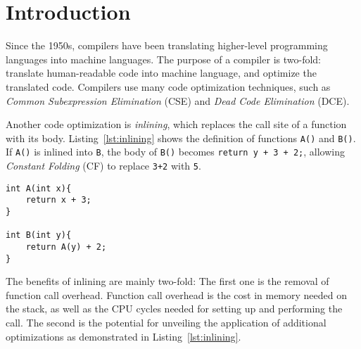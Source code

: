 
\section{Introduction}
\label{introduction}

Since the 1950s, compilers have been translating higher-level programming
languages into machine languages. The purpose of a compiler is two-fold:
translate human-readable code into machine language, and optimize the translated
code. Compilers use many code optimization techniques, such as \textit{Common
Subexpression Elimination} (CSE) and \textit{Dead Code Elimination} (DCE).



Another code optimization is \textit{inlining}, which replaces the call site of
a function with its body. Listing~\ref{lst:inlining} shows the definition of
functions \lstinline!A()! and \lstinline!B()!. If \lstinline!A()! is inlined
into \lstinline!B!, the body of \lstinline!B()! becomes
\lstinline!return y + 3 + 2;!, allowing \textit{Constant Folding} (CF) to
replace \lstinline!3+2! with \lstinline!5!.

\begin{centering}
	\noindent\begin{minipage}{\textwidth}
		\begin{CenteredBox}
		\begin{lstlisting}[style=global_customcpp]
int A(int x){
	return x + 3;
}

int B(int y){
	return A(y) + 2;
}
		\end{lstlisting}
		\end{CenteredBox}
	\end{minipage}
	\label{lst:inlining}
\end{centering}

The benefits of inlining are mainly two-fold: The first one is the removal of
function call overhead. Function call overhead is the cost in memory needed on
the stack, as well as the CPU cycles needed for setting up and performing the
call. The second is the potential for unveiling the application of additional
optimizations as demonstrated in Listing~\ref{lst:inlining}.

